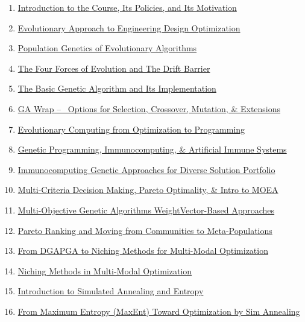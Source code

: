 \documentclass[11pt]{article}
\begin{document}
\begin{enumerate}
	\item \href{https://mp.weixin.qq.com/s/R_onDbHFzyUMIDdg7f_Tmg}{Introduction to the Course, Its Policies, and Its Motivation}	%
	\item \href{https://mp.weixin.qq.com/s/1qptEwi0vn4JmNAmVrtHIA}{Evolutionary Approach to Engineering Design Optimization}	%
	\item \href{https://mp.weixin.qq.com/s/WhljZjP87E7In9R92NjPQQ}{Population Genetics of Evolutionary Algorithms}	%
	\item \href{https://mp.weixin.qq.com/s/-n3Sdl2GOvgzyUdFoM7wsg}{The Four Forces of Evolution and The Drift Barrier}	%
	\item \href{https://mp.weixin.qq.com/s/tRyHqG4TI0MCauFpFQcZNw}{The Basic Genetic Algorithm and Its Implementation}	%
	\item \href{https://mp.weixin.qq.com/s/ZwP8tSILfIHhSNk7YmcgeA}{GA Wrap – \ Options for Selection, Crossover, Mutation, \& Extensions}	%
	\item \href{https://mp.weixin.qq.com/s/JDv3kTeieU26YGdYdPguWA}{Evolutionary Computing from Optimization to Programming}	%
	\item \href{https://mp.weixin.qq.com/s/4uy369k77IEnjmkQFfJZqg}{Genetic Programming, Immunocomputing, \& Artificial Immune Systems}	%
	\item \href{https://mp.weixin.qq.com/s/ru_Kl_u7dDWCNxIOmmcHtQ}{Immunocomputing Genetic Approaches for Diverse Solution Portfolio}	%
	\item \href{https://mp.weixin.qq.com/s/Gk0n0uql22-V3_e_NT5kFw}{Multi-Criteria Decision Making, Pareto Optimality, \& Intro to MOEA}	%
	\item \href{https://mp.weixin.qq.com/s/iq7cN1B9toouW0gd4ly45g}{Multi-Objective Genetic Algorithms WeightVector-Based Approaches}	%
	\item \href{https://mp.weixin.qq.com/s/wdd_VVtSn1BtRow3QUCWUA}{Pareto Ranking and Moving from Communities to Meta-Populations}	%
	\item \href{https://mp.weixin.qq.com/s/pn5-DocuANwwt5shzkcS7A}{From DGAPGA to Niching Methods for Multi-Modal Optimization}	%
	\item \href{https://mp.weixin.qq.com/s/3MP2N0_I1yHD5VNAontWYA}{Niching Methods in Multi-Modal Optimization}	%
	\item \href{https://mp.weixin.qq.com/s/8DGP0N7aJcOwQTpOxptiYQ}{Introduction to Simulated Annealing and Entropy}	%
	\item \href{https://mp.weixin.qq.com/s/szK7lcQfO2u3-cMAaBZysw}{From Maximum Entropy (MaxEnt) Toward Optimization by Sim Annealing}	%

\end{enumerate}
\end{document}
